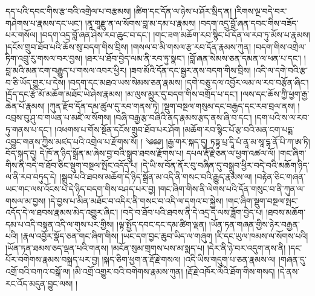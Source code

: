 དད་པའི་དབང་གིས་རྩ་བའི་འགྲེལ་པ་བརྩམས། །ཚིག་དང་དོན་ལ་ཉེས་པ་ཤོར་སྲིད་ན། །རིགས་ལྔ་བདེ་བར་གཤེགས་པ་རྣམས་དང་ཡང་། །ནཱ་གཱརྫུ་ན་ལ་སོགས་བླ་མ་དམ་པ་རྣམས། །བདག་འདྲ་བློ་ཞན་དབང་གིས་བཟོད་པར་གསོལ། །བདག་འདྲ་བློ་ཞན་ཤེས་རབ་ཆུང་བ་དང་། །གང་ཟག་མཆོག་རབ་སྙིང་པོ་དོན་ལ་རབ་ཏུ་མོས་པ་རྣམས། །དངོས་གྲུབ་ཐོབ་པའི་ཆོས་སུ་བདག་གིས་བྲིས། །གསལ་བ་མི་གསལ་རྩ་རབ་དོན་རྣམས་ཀུན། །བདག་གིས་འགྲེལ་ཏིག་འབྲུ་རུ་གསལ་བར་བྱས། །ཐར་པ་ཐོབ་བྱེད་ལམ་ནི་རབ་ཏུ་སྣང་། །བློ་ཞན་སེམས་ཅན་དམན་ལ་ཕན་པ་དང་། །བླ་མའི་མན་ངག་བརྒྱུད་པ་གསལ་འབར་ཕྱིར། །ཟབ་མོའི་དོན་དང་སྦྱར་ནས་བདག་གིས་བྲིས། །འདི་ལ་དགེ་བའི་རྩ་བ་ཅི་ཡོད་གྱུར་པ་དེས། །བདག་དང་མཐའ་ཡས་སེམས་ཅན་རྣམས། །དགེ་བཅུ་དལ་འབྱོར་ལམ་ལ་རབ་བརྩོན་ཞིང་། །དྲོད་དང་རྩེ་མོ་མཆོག་མཐོང་ཡེ་ཤེས་རྣམས། །མ་ལུས་མྱུར་དུ་བདག་གིས་བགྲོད་པ་དང་། །ལས་དང་ཆོས་ཀྱི་ཕྱག་རྒྱ་ཆེན་པོ་རྣམས། །ཀུན་རྫོབ་དོན་དམ་ཚུལ་དུ་རབ་གནས་ཏེ། །སྡུག་བསྔལ་གསུམ་དང་བརྒྱད་དང་རབ་བྲལ་ནས། །འབྲས་བུ་ཤུ་བ་གཡན་པ་མཛེ་ལ་སོགས། །བཞི་བརྒྱ་རྩ་བཞིའི་ནད་རྣམས་རྩད་ནས་ཞི་བ་དང་། །དག་པའི་ས་ལ་རབ་ཏུ་གནས་པ་དང་། །འཕགས་པ་གོས་སྔོན་དངོས་གྲུབ་ཐོབ་པར་ཤོག །མཆོག་རབ་སྙིང་པོ་རྩ་བའི་མན་ངག་པདྨ་འབྱུང་གནས་ཀྱིས་མཛད་པའི་འགྲེལ་པ་རྫོགས་སོ། ། ༄༅༅། །རྒྱ་གར་སྐད་དུ། ཏཏྟྭ་པྲ་དཱི་པཾ་ནཱ་མ་སཱ་དྷ་ནོ་པི་ཀ་ཨ་ཏི། བོད་སྐད་དུ། དེ་ཁོ་ན་ཉིད་སྒྲོན་མ་ཞེས་བྱ་བའི་སྒྲུབ་ཐབས་རྫོགས་པ། དཔལ་རྡོ་རྗེ་ཅན་ལ་ཕྱག་འཚལ་ལོ། །གང་ཞིག་གིས་ནི་བདེ་བ་ཐོབ་ཅིང་སྡུག་བསྔལ་སྤོང་འདོད་པ། །དེ་ཡི་ས་བོན་ནོར་བུ་བཞིན་དུ་བསྒྲུབ་ཕྱིར་བདེ་བའི་མཆོག་ཉིད་ལ་ནི་རབ་བཏུད་དེ། །སྒྲུབ་པའི་ཐབས་མཆོག་དེ་ཉིད་སྒྲོན་མ་འདི་ནི་གསང་བའི་རྒྱུད་རྣམས་ལ། །བརྟེན་ཅིང་གཞན་ཡང་གང་ལས་འོངས་པ་དེ་ཉིད་བདག་གིས་བཤད་པར་བྱ། །གང་ཞིག་གིས་ནི་ལེགས་པའི་དོན་གསུང་བ་ནི་ཀུན་ལ་གསལ་མ་བྱས། །དེ་བྱས་པ་མིན་མཐོང་བ་འདིར་ནི་གསང་བ་འདི་ལ་དགའ་བ་སྐྱེས། །གང་ཞིག་སྡུག་བསྔལ་སྤང་འདོད་དེ་ལ་ཐབས་རྣམས་མེད་འགྱུར་ཞིང་། །བདེ་བ་ཐོབ་པའི་ཐབས་ནི་དེ་འདྲ་དེ་ལས་ཟློག་བྱེད་པ། །ཐབས་མཆོག་དམ་པ་འདི་བསྟན་འདི་ལ་གུས་པར་གྱིས། །ལྟ་སྤྱོད་དབང་དང་དམ་ཚིག་ལྡན། །ཡོན་ཏན་གཞན་གྱིས་ཉེར་བརྒྱན་པའི། །རྣལ་འབྱོར་སྣོད་ཅན་གང་ཞིག་གིས། །ཡང་དག་བྱང་ཆུབ་ཡིད་ལ་གཞུག །རི་དང་ཡུལ་ཁམས་ལ་སོགས་པའི། །ཡོན་ཏན་ཐམས་ཅད་ལྡན་པའི་གནས། །མངོན་སུམ་གྲགས་པས་མ་སྨད་པ། །དེར་ནི་ཉེ་བར་འདུག་ནས་ནི། །དང་པོར་བགེགས་རྣམས་བསྐྲད་པར་བྱ། །སྐད་ཅིག་ཕྱག་ན་རྡོ་རྗེ་གསལ། །འདི་ཡིས་གདུག་པ་ཅན་རྣམས་ལ། །གཞན་དུ་འགྲོ་བའི་བཀའ་བསྒོ་ལ། །མི་འགྲོ་འགྱུར་བའི་བགེགས་རྣམས་ཀུན། །རྡོ་རྗེ་འཁོར་ལོའི་ཐོག་གིས་གསད། །དེ་ནས་རང་འོད་མདུན་བྱུང་ལས། །

